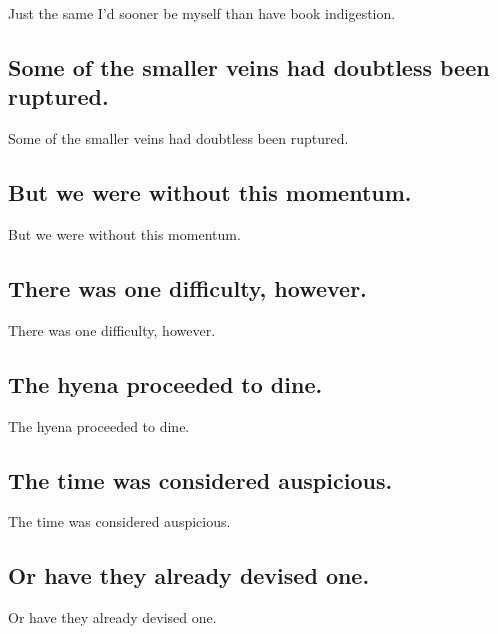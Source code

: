 \documentclass[]{article}
\begin{document}
Just the same I'd sooner be myself than have book indigestion.

\hypertarget{some-of-the-smaller-veins-had-doubtless-been-ruptured.}{%
\subsection{Some of the smaller veins had doubtless been
ruptured.}\label{some-of-the-smaller-veins-had-doubtless-been-ruptured.}}

Some of the smaller veins had doubtless been ruptured.

\hypertarget{but-we-were-without-this-momentum.}{%
\subsection{But we were without this
momentum.}\label{but-we-were-without-this-momentum.}}

But we were without this momentum.

\hypertarget{there-was-one-difficulty-however.}{%
\subsection{There was one difficulty,
however.}\label{there-was-one-difficulty-however.}}

There was one difficulty, however.

\hypertarget{the-hyena-proceeded-to-dine.}{%
\subsection{The hyena proceeded to
dine.}\label{the-hyena-proceeded-to-dine.}}

The hyena proceeded to dine.

\hypertarget{the-time-was-considered-auspicious.}{%
\subsection{The time was considered
auspicious.}\label{the-time-was-considered-auspicious.}}

The time was considered auspicious.

\hypertarget{or-have-they-already-devised-one.}{%
\subsection{Or have they already devised
one.}\label{or-have-they-already-devised-one.}}

Or have they already devised one.
\end{document}
